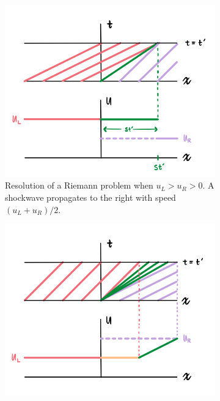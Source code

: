 \documentclass{myproject}
\begin{document}

\begin{figure}
    \centering
    \begin{subfigure}{.48\textwidth}
        \centering
        \includegraphics[width=1.0\textwidth]{riemann_shockwave.png}
        \caption{Resolution of a Riemann problem when $u_L > u_R > 0$. A shockwave propagates to the right with speed $(u_L+u_R)/2$.}
        \label{fig:shock}
    \end{subfigure}\hfill
    \begin{subfigure}{.48\textwidth}
        \centering
        \includegraphics[width=1\textwidth]{riemann_rarefaction.png}

\end{subfigure}
\end{figure}
\end{document}
